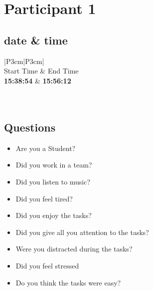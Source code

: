 \section{Participant 1}

\subsection{date \& time}
\begin{table}[ht]
  \begin{tabular}{|P{3cm}|P{3cm}|}
	    	\\ \hline
    Start Time      			& End Time   					\\ \hline
   \textbf{15:38:54} 	& \textbf{15:56:12}    	\\ \hline
       						\\ \hline
    			\\ \hline
  \end{tabular}
  \newline\newline
  \caption{p1: date and time}\label{dandt1}
\end{table}

\subsection{Questions}
\begin{itemize}
  \item[\Checkmark] Are you a Student?
  \item[\XSolidBrush] Did you work in a team?
  \item[\XSolidBrush] Did you listen to music?
  \item[\Checkmark] Did you feel tired?
  \item[\XSolidBrush] Did you enjoy the tasks?
  \item[\XSolidBrush] Did you give all you attention to the tasks?
  \item[\XSolidBrush] Were you distracted during the tasks?
  \item[\Checkmark] Did you feel stressed
  \item[\XSolidBrush] Do you think the tasks were easy?  
\end{itemize}

\newpage

